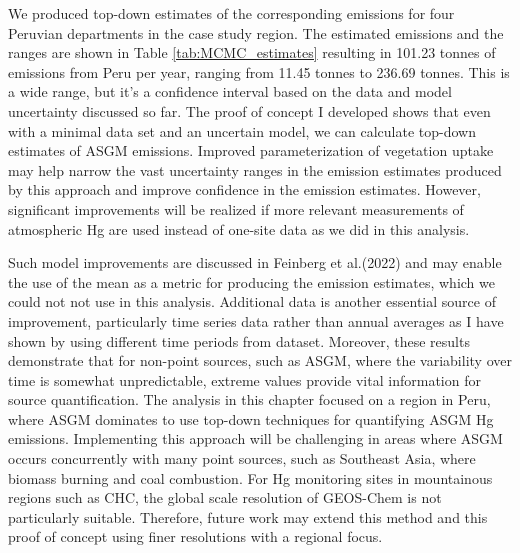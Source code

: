 \begin{flushleft}
  We produced top-down estimates of the corresponding emissions for four Peruvian departments in the case study region. The estimated emissions and the ranges are shown in Table \ref{tab:MCMC_estimates} resulting in 101.23 tonnes of emissions from Peru per year, ranging from 11.45 tonnes to 236.69 tonnes. This is a wide range, but it's a confidence interval based on the data and model uncertainty discussed so far. The proof of concept I developed shows that even with a minimal data set and an uncertain model, we can calculate top-down estimates of ASGM \hg emissions. Improved parameterization of vegetation uptake may help narrow the vast uncertainty ranges in the emission estimates produced by this approach and improve confidence in the \hg emission estimates. However, significant improvements will be realized if more relevant measurements of atmospheric Hg are used instead of one-site data as we did in this analysis.  
  \end{flushleft}
  
  \begin{flushleft}
  Such model improvements are discussed in Feinberg et al.(2022)\cite{feinberg_evaluating_2022} and may enable the use of the mean as a metric for producing the \hg emission estimates, which we could not not use in this analysis. Additional data is another essential source of improvement, particularly time series data rather than annual averages as I have shown by using different time periods from \obsC dataset. Moreover, these results demonstrate that for non-point sources, such as ASGM, where the variability over time is somewhat unpredictable, extreme values provide vital information for source quantification. The analysis in this chapter focused on a region in Peru, where ASGM dominates to use top-down techniques for quantifying ASGM Hg emissions. Implementing this approach will be challenging in areas where ASGM occurs concurrently with many point sources, such as Southeast Asia, where biomass burning and coal combustion. For Hg monitoring sites in mountainous regions such as CHC, the global scale resolution of GEOS-Chem is not particularly suitable. Therefore, future work may extend this method and this proof of concept using finer resolutions with a regional focus.
   \end{flushleft}
  
